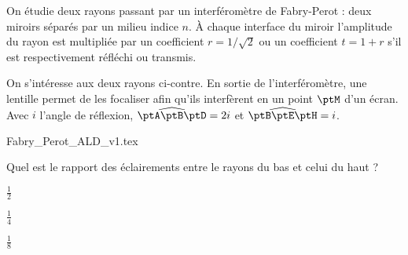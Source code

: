                                 \initialisationPartieGauche %
On étudie deux rayons passant par un interféromètre de Fabry-Perot : deux miroirs séparés par un milieu indice $n$. À chaque interface du miroir l'amplitude du rayon est multipliée par un coefficient $r=1/\sqrt{2}$ ou un coefficient $t=1+r$ s'il est respectivement réfléchi ou transmis.

On s'intéresse aux deux rayons ci-contre. En sortie de l'interféromètre, une lentille permet de les focaliser afin qu'ils interfèrent en un point $\ptM$ d'un écran. Avec $i$ l'angle de réflexion, $\widehat{\ptA \ptB \ptD}=2i$ et $\widehat{\ptB \ptE \ptH}=i$.

                                \initialisationPartieDroite %
	\begin{center}
		{Fabry_Perot_ALD_v1.tex}
	\end{center}
                               \finalisationDuPartageDePage %

\debutEntrainement


\begin{enonce}
	Quel est le rapport des éclairements entre le rayons du bas et celui du haut ? 
	
	\begin{listeQCM3Colonnes}
	\item $\frac{1}{2}$
	\item $\frac{1}{4}$
	\item $\frac{1}{8}$
	\end{listeQCM3Colonnes}
\end{enonce}

